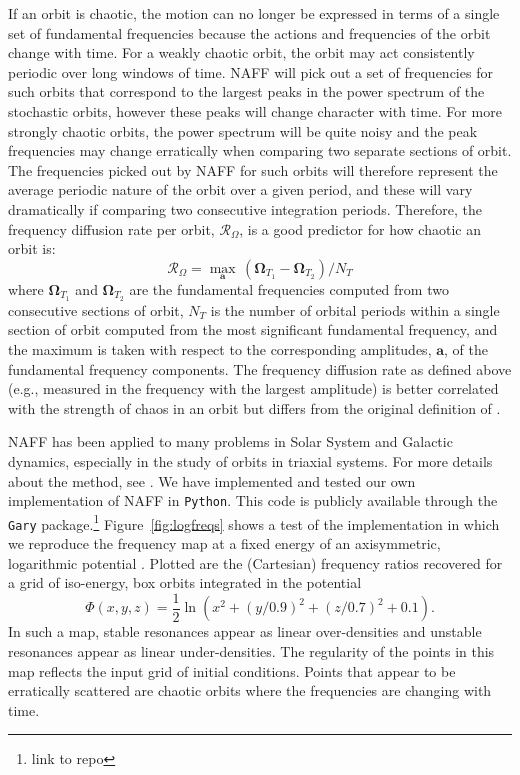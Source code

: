 \documentclass[letterpaper,12pt,preprint]{aastex}
\newcommand{\bs}[1]{\boldsymbol{#1}}
\newcommand{\fdrate}{\mathcal{R}_\Omega}
\begin{document}
If an orbit is chaotic, the motion can no longer be expressed in terms of a single set of fundamental frequencies because the actions and frequencies of the orbit change with time. For a weakly chaotic orbit, the orbit may act consistently periodic over long windows of time. NAFF will pick out a set of frequencies for such orbits that correspond to the largest peaks in the power spectrum of the stochastic orbits, however these peaks will change character with time. For more strongly chaotic orbits, the power spectrum will be quite noisy and the peak frequencies may change erratically when comparing two separate sections of orbit. The frequencies picked out by NAFF for such orbits will therefore represent the average periodic nature of the orbit over a given period, and these will vary dramatically if comparing two consecutive integration periods. Therefore, the frequency diffusion rate per orbit, $\fdrate$, is a good predictor for how chaotic an orbit is:
\begin{equation}
	\fdrate = \max_{\bs{a}} \, (\bs{\Omega}_{T_1} - \bs{\Omega}_{T_2}) / N_T \label{eq:fdrate}
\end{equation}
where $\bs{\Omega}_{T_1}$ and $\bs{\Omega}_{T_2}$ are the fundamental frequencies computed from two consecutive sections of orbit, $N_T$ is the number of orbital periods within a single section of orbit computed from the most significant fundamental frequency, and the maximum is taken with respect to the corresponding amplitudes, $\bs{a}$, of the fundamental frequency components. The frequency diffusion rate as defined above (e.g., measured in the frequency with the largest amplitude) is better correlated with the strength of chaos in an orbit \citep{valluri??} but differs from the original definition of \cite{valluri98}.

NAFF has been applied to many problems in Solar System and Galactic dynamics, especially in the study of orbits in triaxial systems. For more details about the method, see \cite{papaphilippou96, laskar, etc.}. We have implemented and tested our own implementation of NAFF in \texttt{Python}. This code is publicly available through the \texttt{Gary} package.\footnote{link to repo} Figure~\ref{fig:logfreqs} shows a test of the implementation in which we reproduce the frequency map at a fixed energy of an axisymmetric, logarithmic potential \cite[][pg. 260, Figure~3.45]{binneytremaine}. Plotted are the (Cartesian) frequency ratios recovered for a grid of iso-energy, box orbits integrated in the potential
\begin{equation}
	\Phi(x,y,z) = \frac{1}{2}\ln\left(x^2 + (y/0.9)^2 + (z/0.7)^2 + 0.1\right). \label{eq:logpotential}
\end{equation}
In such a map, stable resonances appear as linear over-densities and unstable resonances appear as linear under-densities. The regularity of the points in this map reflects the input grid of initial conditions. Points that appear to be erratically scattered are chaotic orbits where the frequencies are changing with time.
\end{document}
